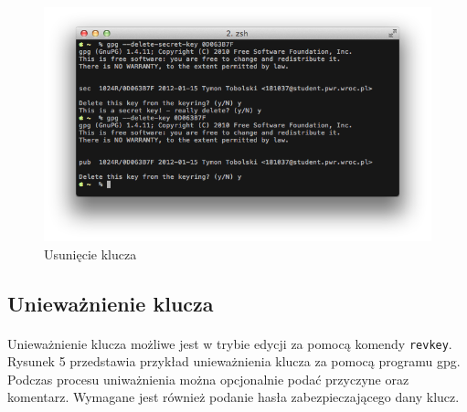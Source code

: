 \documentclass[wide,a4paper,titlepage,12pt] {article}
\begin{document}
  \begin{figure}[h!]
    \begin{center}
      \includegraphics[width=\textwidth]{img/4.png}
      \caption{Usunięcie klucza}
    \end{center}
  \end{figure}

  \newpage

  \subsection{Unieważnienie klucza}
  \paragraph{}
  Unieważnienie klucza możliwe jest w trybie edycji za pomocą komendy \texttt{revkey}. Rysunek 5 przedstawia przykład unieważnienia klucza za pomocą programu gpg. Podczas procesu uniważnienia można opcjonalnie podać przyczyne oraz komentarz. Wymagane jest również podanie hasła zabezpieczającego dany klucz.
\end{document}
